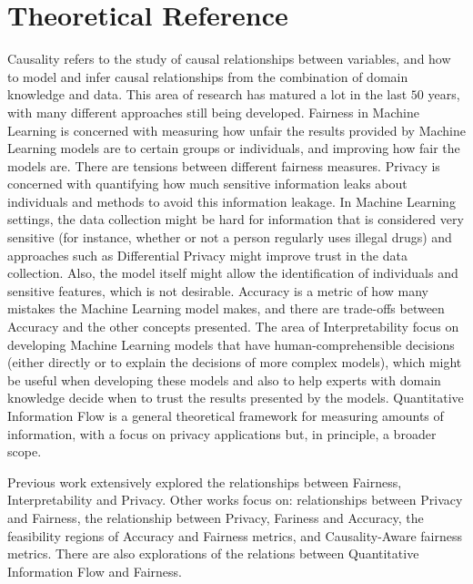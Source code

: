 \documentclass[12pt]{article}
\begin{document}
\section{Theoretical Reference}

Causality refers to the study of causal relationships between variables, and how to model and infer causal relationships from the combination of domain knowledge and data\cite{Causality}. This area of research has matured a lot in the last $50$ years, with many different approaches still being developed. Fairness in Machine Learning is concerned with measuring how unfair the results provided by Machine Learning models are to certain groups or individuals\cite{FairMeasures}, and improving how fair the models are\cite{FairSolve}. There are tensions between different fairness measures\cite{Impossibility}\cite{FairTensions}. Privacy is concerned with quantifying how much sensitive information leaks about individuals and methods to avoid this information leakage. In Machine Learning settings, the data collection might be hard for information that is considered very sensitive (for instance, whether or not a person regularly uses illegal drugs) and approaches such as Differential Privacy\cite{DP} might improve trust in the data collection. Also, the model itself might allow the identification of individuals and sensitive features, which is not desirable\cite{liu2021machine}. Accuracy is a metric of how many mistakes the Machine Learning model makes, and there are trade-offs between Accuracy and the other concepts presented\cite{Sok}\cite{Carlos}\cite{Rachel}. The area of Interpretability focus on developing Machine Learning models that have human-comprehensible decisions (either directly or to explain the decisions of more complex models), which might be useful when developing these models\cite{ExplDev} and also to help experts with domain knowledge decide when to trust the results presented by the models\cite{ExplainExperts}. Quantitative Information Flow is a general theoretical framework for measuring amounts of information, with a focus on privacy applications but, in principle, a broader scope\cite{QIF}.

Previous work extensively explored the relationships between Fairness, Interpretability and Privacy\cite{Sok}. Other works focus on: relationships between Privacy and Fairness\cite{Awareness}, the relationship between Privacy, Fariness and Accuracy\cite{Rachel}, the feasibility regions of Accuracy and Fairness metrics\cite{Carlos}\cite{Reductions}, and Causality-Aware fairness metrics\cite{CausalFair}. There are also explorations of the relations between Quantitative Information Flow and Fairness\cite{Bruno}.
\end{document}
